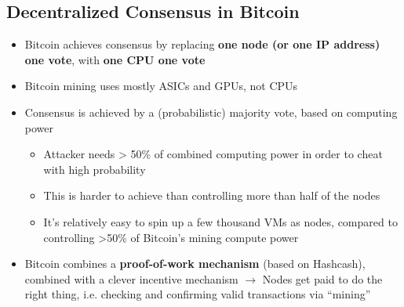 \subsection{Decentralized Consensus in Bitcoin}
\begin{itemize}
	\item Bitcoin achieves consensus by replacing \textbf{one node (or one IP address) one vote}, with \textbf{one CPU one vote}
	\item Bitcoin mining uses mostly ASICs and GPUs, not CPUs
	\item Consensus is achieved by a (probabilistic) majority vote, based on computing power
	\begin{itemize}
		\item Attacker needs > 50\% of combined computing power in order to cheat with high probability
		\item This is harder to achieve than controlling more than half of the nodes
		\item It's relatively easy to spin up a few thousand VMs as nodes, compared to controlling >50\% of Bitcoin's mining compute power
	\end{itemize}
	\item Bitcoin combines a \textbf{proof-of-work mechanism} (based on Hashcash), combined with a clever incentive mechanism $\rightarrow$ Nodes get paid to do the right thing, i.e. checking and confirming valid transactions via ``mining''
\end{itemize}

